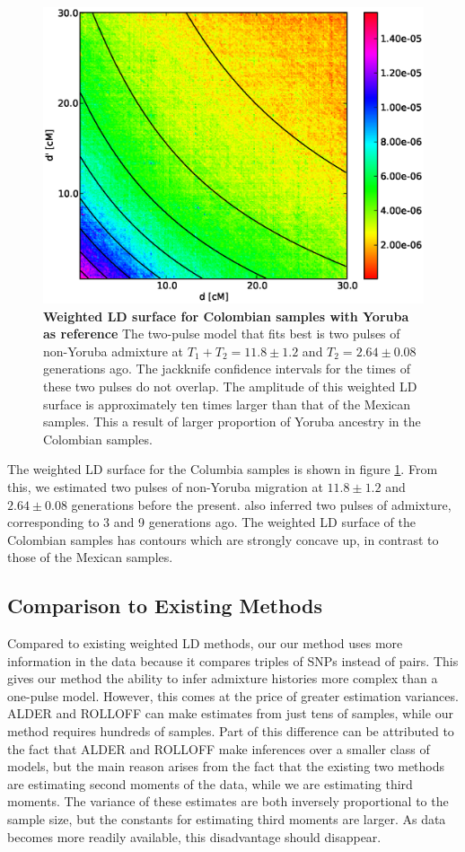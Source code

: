 \begin{figure}
\includegraphics[scale=.6]{CLM.eps}
\caption{
{\bf Weighted LD surface for Colombian samples with Yoruba as reference} The two-pulse model that fits best is two pulses of non-Yoruba admixture at $T_1+T_2=11.8\pm 1.2$ and $T_2=2.64 \pm 0.08$ generations ago. The jackknife confidence intervals for the times of these two pulses do not overlap. The amplitude of this weighted LD surface is approximately ten times larger than that of the Mexican samples. This a result of larger proportion of Yoruba ancestry in the Colombian samples.
}
\label{ASH_CLM}
\end{figure}

The weighted LD surface for the Columbia samples is shown in figure \ref{ASH_CLM}. From this, we estimated two pulses of non-Yoruba migration at $11.8\pm 1.2$ and $2.64\pm0.08$ generations before the present. \cite{gravel2013reconstructing} also inferred two pulses of admixture, corresponding to 3 and 9 generations ago. The weighted LD surface of the Colombian samples has contours which are strongly concave up, in contrast to those of the Mexican samples. 
\subsection{Comparison to Existing Methods}
Compared to existing weighted LD methods, our our method uses more information in the data because it compares triples of SNPs instead of pairs. This gives our method the ability to infer admixture histories more complex than a one-pulse model. However, this comes at the price of greater estimation variances. ALDER and ROLLOFF can make estimates from just tens of samples, while our method requires hundreds of samples. Part of this difference can be attributed to the fact that ALDER and ROLLOFF make inferences over a smaller class of models, but the main reason arises from the fact that the existing two methods are estimating second moments of the data, while we are estimating third moments. The variance of these estimates are both inversely proportional to the sample size, but the constants for estimating third moments are larger. As data becomes more readily available, this disadvantage should disappear.

